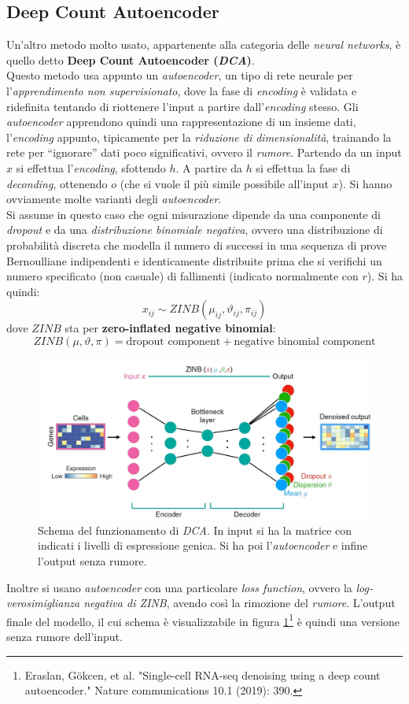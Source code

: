 \documentclass[a4paper,12pt, oneside]{book}
\begin{document}
\subsection{Deep Count Autoencoder}
Un'altro metodo molto usato, appartenente alla categoria delle \textit{neural
  networks}, è quello detto \textbf{Deep Count Autoencoder (\textit{DCA})}.\\
Questo metodo usa appunto un \textit{autoencoder}, un tipo di rete neurale per
l'\textit{apprendimento non supervisionato}, dove la fase di \textit{encoding} è
validata e ridefinita tentando di riottenere l'input a partire
dall'\textit{encoding} stesso. Gli \textit{autoencoder} apprendono quindi una
rappresentazione di un insieme dati, l'\textit{encoding} appunto, tipicamente
per la \textit{riduzione di dimensionalità}, trainando la rete per ``ignorare''
dati poco significativi, ovvero il \textit{rumore}. Partendo da un input $x$ si
effettua l'\textit{encoding}, sfottendo $h$. A partire da $h$ si effettua la
fase di \textit{deconding}, ottenendo $o$ (che si vuole il più simile possibile
all'input $x$). Si hanno ovviamente molte varianti degli \textit{autoencoder}.\\
Si assume in questo caso che ogni misurazione dipende da una componente di
\textit{dropout} e da una \textit{distribuzione binomiale negativa}, ovvero una
distribuzione di probabilità discreta che modella il numero di successi in una
sequenza di prove Bernoulliane indipendenti e identicamente distribuite prima
che si verifichi un numero specificato (non casuale) di fallimenti (indicato
normalmente con $r$). Si ha quindi:
\[x_{ij}\sim ZINB(\mu_{ij},\vartheta_{ij},\pi_{ij})\]
dove $ZINB$ sta per \textbf{zero-inflated negative binomial}:
\[ZINB(\mu,\vartheta,\pi)=\mbox{dropout component}+\mbox{negative binomial
    component}\]
\begin{figure}
  \centering
  \includegraphics[scale = 0.185]{img/dca.jpg}
  \caption{Schema del funzionamento di \textit{DCA}. In input si ha la matrice
    con indicati i livelli di espressione genica. Si ha poi
    l'\textit{autoencoder} e infine l'output senza rumore.}
  \label{fig:dca}
\end{figure}
Inoltre si usano \textit{autoencoder} con una particolare \textit{loss
  function}, ovvero la \textit{log-verosimiglianza negativa di ZINB}, avendo
così la rimozione del \textit{rumore}. L'output finale del modello, il cui
schema è visualizzabile in figura \ref{fig:dca}\footnote{Eraslan, Gökcen, et
      al. "Single-cell RNA-seq denoising using a deep count 
      autoencoder." Nature communications 10.1 (2019): 390.} è quindi una
versione senza rumore dell'input.
\end{document}
